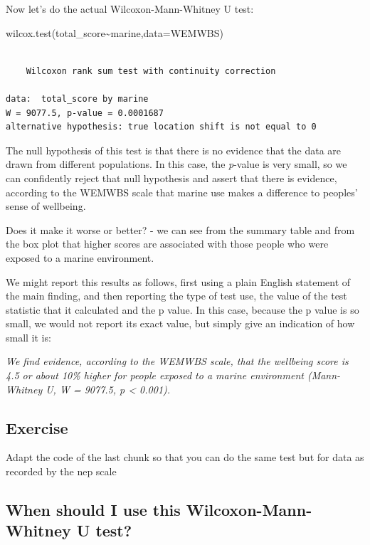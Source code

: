 \documentclass[
  letterpaper,
  DIV=11,
  numbers=noendperiod]{scrreprt}
\newenvironment{Shaded}{\begin{snugshade}}{\end{snugshade}}
\newcommand{\AttributeTok}[1]{\textcolor[rgb]{0.40,0.45,0.13}{#1}}
\newcommand{\FunctionTok}[1]{\textcolor[rgb]{0.28,0.35,0.67}{#1}}
\newcommand{\NormalTok}[1]{\textcolor[rgb]{0.00,0.23,0.31}{#1}}
\newcommand{\SpecialCharTok}[1]{\textcolor[rgb]{0.37,0.37,0.37}{#1}}
\begin{document}
Now let's do the actual Wilcoxon-Mann-Whitney U test:

\begin{Shaded}
\begin{Highlighting}[]
\FunctionTok{wilcox.test}\NormalTok{(total\_score}\SpecialCharTok{\textasciitilde{}}\NormalTok{marine,}\AttributeTok{data=}\NormalTok{WEMWBS)}
\end{Highlighting}
\end{Shaded}

\begin{verbatim}

    Wilcoxon rank sum test with continuity correction

data:  total_score by marine
W = 9077.5, p-value = 0.0001687
alternative hypothesis: true location shift is not equal to 0
\end{verbatim}

The null hypothesis of this test is that there is no evidence that the
data are drawn from different populations. In this case, the
\emph{p}-value is very small, so we can confidently reject that null
hypothesis and assert that there is evidence, according to the WEMWBS
scale that marine use makes a difference to peoples' sense of wellbeing.

Does it make it worse or better? - we can see from the summary table and
from the box plot that higher scores are associated with those people
who were exposed to a marine environment.

We might report this results as follows, first using a plain English
statement of the main finding, and then reporting the type of test use,
the value of the test statistic that it calculated and the p value. In
this case, because the p value is so small, we would not report its
exact value, but simply give an indication of how small it is:

\emph{We find evidence, according to the WEMWBS scale, that the
wellbeing score is 4.5 or about 10\% higher for people exposed to a
marine environment (Mann-Whitney U, W = 9077.5, p \textless{} 0.001).}

\subsection{Exercise}\label{exercise}

Adapt the code of the last chunk so that you can do the same test but
for data as recorded by the nep scale

\subsection{When should I use this Wilcoxon-Mann-Whitney U
test?}\label{when-should-i-use-this-wilcoxon-mann-whitney-u-test}
\end{document}
